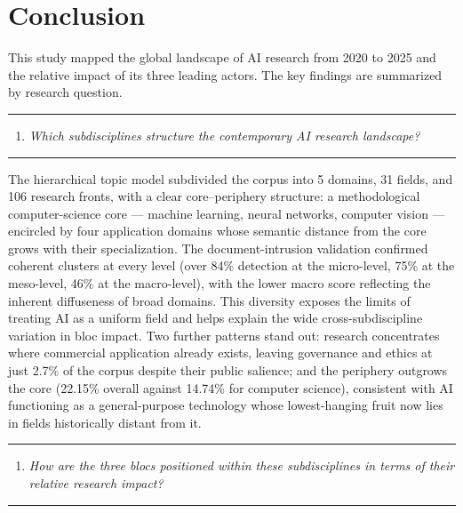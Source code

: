 \documentclass{article}
\begin{document}
	\section{Conclusion}
	
	This study mapped the global landscape of AI research from 2020 to 2025 and the relative impact of its three leading actors. The key findings are summarized by research question.
	
	\vspace{1em}
	\rule{\linewidth}{0.4pt}
	\begin{enumerate}
		\item[\textbf{RQ1}]\hspace*{2em}\parbox[t]{\dimexpr\linewidth-2em}{
			\textit{Which subdisciplines structure the contemporary AI research landscape?}
		}
	\end{enumerate}
	\vspace{0.25em}
	\rule{\linewidth}{0.4pt}
	\vspace{1em}
	
	The hierarchical topic model subdivided the corpus into 5 domains, 31 fields, and 106 research fronts, with a clear core--periphery structure: a methodological computer-science core --- machine learning, neural networks, computer vision --- encircled by four application domains whose semantic distance from the core grows with their specialization. The document-intrusion validation confirmed coherent clusters at every level (over 84\% detection at the micro-level, 75\% at the meso-level, 46\% at the macro-level), with the lower macro score reflecting the inherent diffuseness of broad domains. This diversity exposes the limits of treating AI as a uniform field and helps explain the wide cross-subdiscipline variation in bloc impact. Two further patterns stand out: research concentrates where commercial application already exists, leaving governance and ethics at just 2.7\% of the corpus despite their public salience; and the periphery outgrows the core (22.15\% overall against 14.74\% for computer science), consistent with AI functioning as a general-purpose technology whose lowest-hanging fruit now lies in fields historically distant from it.
	
	\vspace{1em}
	\rule{\linewidth}{0.4pt}
	\begin{enumerate}
		\item[\textbf{RQ2}]\hspace*{2em}\parbox[t]{\dimexpr\linewidth-2em}{
			\textit{How are the three blocs positioned within these subdisciplines in terms of their relative research impact?}
		}
	\end{enumerate}
	\vspace{0.25em}
	\rule{\linewidth}{0.4pt}
	\vspace{1em}
	
\end{document}
